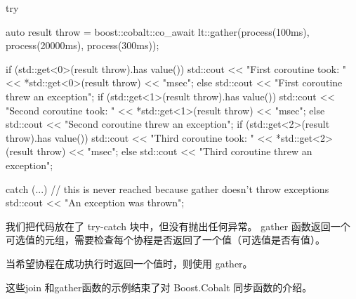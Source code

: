 \begin{cpp}
try{
    auto result throw =
    boost::cobalt::co_await lt::gather(process(100ms),
                                       process(20000ms),
                                       process(300ms));

    if (std::get<0>(result throw).has value()) {
        std::cout << "First coroutine took: "
                  << *std::get<0>(result throw)
                  << "msec\n";
    }
    else {
        std::cout << "First coroutine threw an exception\n";
    }
    if (std::get<1>(result throw).has value()) {
        std::cout << "Second coroutine took: "
                  << *std::get<1>(result throw)
                  << "msec\n";
    }
    else {
        std::cout << "Second coroutine threw an exception\n";
    }
    if (std::get<2>(result throw).has value()) {
        std::cout << "Third coroutine took: "
                  << *std::get<2>(result throw)
                  << "msec\n";
    }
    else {
        std::cout << "Third coroutine threw an exception\n";
    }
}
catch (...) {
    // this is never reached because gather doesn't throw exceptions
    std::cout << "An exception was thrown\n";
}
\end{cpp}

我们把代码放在了 try-catch 块中，但没有抛出任何异常。 gather 函数返回一个可选值的元组，需要检查每个协程是否返回了一个值（可选值是否有值）。

当希望协程在成功执行时返回一个值时，则使用 gather。

这些join 和gather函数的示例结束了对 Boost.Cobalt 同步函数的介绍。






















